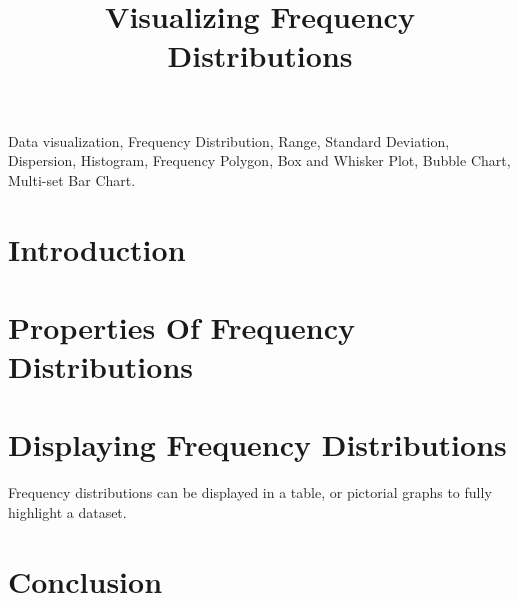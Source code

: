 \documentclass[conference]{IEEEtran}
\begin{document}
\title{Visualizing Frequency Distributions}

\author{
}

\maketitle

\begin{abstract}

\end{abstract}

\begin{IEEEkeywords}
Data visualization, Frequency Distribution, Range, Standard Deviation, Dispersion,
Histogram, Frequency Polygon, Box and Whisker Plot, Bubble Chart, Multi-set Bar Chart.
\end{IEEEkeywords}

\section{Introduction}
 

\section{Properties Of Frequency Distributions}


\section{Displaying Frequency Distributions}
Frequency distributions can be displayed in a table, or pictorial graphs to 
fully highlight a dataset.
 

\section{Conclusion}
 

\nocite{*}

 
\end{document}
